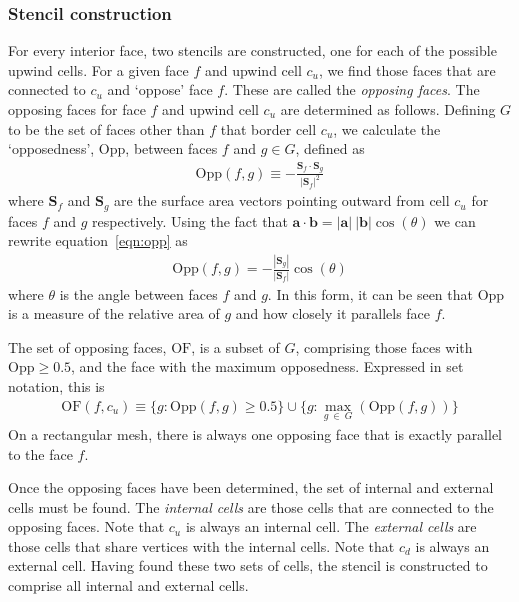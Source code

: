 \subsubsection{Stencil construction}
For every interior face, two stencils are constructed, one for each of the possible upwind cells.  For a given face $f$ and upwind cell $c_u$, we find those faces that are connected to $c_u$ and `oppose' face $f$.  These are called the \textit{opposing faces}.
The opposing faces for face $f$ and upwind cell $c_u$ are determined as follows.
Defining $G$ to be the set of faces other than $f$ that border cell $c_u$, we calculate the `opposedness', $\mathrm{Opp}$, between faces $f$ and $g \in G$, defined as
\begin{align}
	\mathrm{Opp}(f, g) \equiv - \frac{\mathbf{S}_f \cdot \mathbf{S}_g}{|\mathbf{S}_f|^2} \label{eqn:opp}
\end{align}
where $\mathbf{S}_f$ and $\mathbf{S}_g$ are the surface area vectors pointing outward from cell $c_u$ for faces $f$ and $g$ respectively.
Using the fact that $\mathbf{a} \cdot \mathbf{b} = |\mathbf{a}|\:|\mathbf{b}| \cos(\theta)$ we can rewrite equation~\eqref{eqn:opp} as
\begin{align}
	\mathrm{Opp}(f, g) = - \frac{|\mathbf{S}_g|}{|\mathbf{S}_f|} \cos(\theta)
\end{align}
where $\theta$ is the angle between faces $f$ and $g$.  In this form, it can be seen that $\mathrm{Opp}$ is a measure of the relative area of $g$ and how closely it parallels face $f$.

The set of opposing faces, $\mathrm{OF}$, is a subset of $G$, comprising those faces with $\mathrm{Opp} \geq 0.5$, and the face with the maximum opposedness.  Expressed in set notation, this is
\begin{align}
	\mathrm{OF}(f,c_u) \equiv \{ g : \mathrm{Opp}(f, g) \geq 0.5 \} \cup \{ g : \max_{g\:\in\:G}(\mathrm{Opp}(f, g)) \} 
\end{align}
On a rectangular mesh, there is always one opposing face that is exactly parallel to the face $f$.

Once the opposing faces have been determined, the set of internal and external cells must be found.  The \textit{internal cells} are those cells that are connected to the opposing faces.  Note that $c_u$ is always an internal cell.  The \textit{external cells} are those cells that share vertices with the internal cells.  Note that $c_d$ is always an external cell.  Having found these two sets of cells, the stencil is constructed to comprise all internal and external cells.

